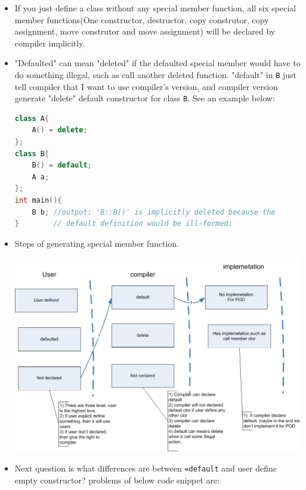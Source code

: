 \documentclass[a4paper,11pt,twoside]{book}
\begin{document}
\begin{itemize}
\item If you just define a class without any special member function, all six special member functions(One constructor, destructor, copy construtor, copy assignment, move construtor and move assignment) will be declared by compiler implicitly. 


\item "Defaulted" can mean "deleted" if the defaulted special member would have to do something illegal, such as call another deleted function. "default" in \texttt{B} just tell compiler that I want to use compiler's version, and compiler version generate "delete" default constructor for class \texttt{B}. See an example below: 

\begin{lstlisting}[frame=single, language=c++]
class A{
	A() = delete;
};
class B{
	B() = default; 
	A a;
};
int main(){
	B b; //output: 'B::B()' is implicitly deleted because the
}	     // default definition would be ill-formed:       
\end{lstlisting}

    \item Steps of generating special member function. 
\begin{center}
\includegraphics[scale=0.8]{pics/ctor.png} 
\end{center}

	\item Next question is what differences are between \verb|=default| and user define empty constructor? problems of below code snippet are:
	

\end{itemize}
\end{document}
